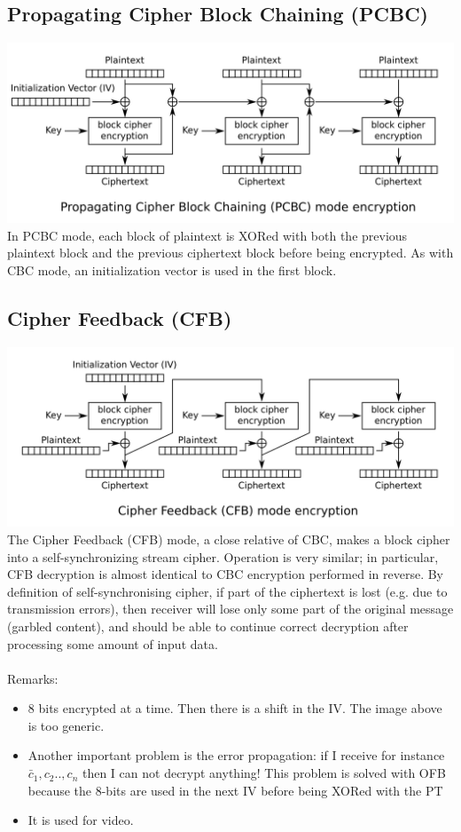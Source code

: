 \documentclass[10pt,a4paper]{article}
\begin{document}
\subsection{Propagating Cipher Block Chaining (PCBC)}
\includegraphics[scale=0.2]{img/PCBC.png}
\newline 
In PCBC mode, each block of plaintext is XORed with both the previous plaintext block and the previous ciphertext block before being encrypted. As with CBC mode, an initialization vector is used in the first block.
\subsection{Cipher Feedback (CFB)}
\includegraphics[scale=0.2]{img/CFB.png}
\newline 
The Cipher Feedback (CFB) mode, a close relative of CBC, makes a block cipher into a self-synchronizing stream cipher. Operation is very similar; in particular, CFB decryption is almost identical to CBC encryption performed in reverse.
By definition of self-synchronising cipher, if part of the ciphertext is lost (e.g. due to transmission errors), then receiver will lose only some part of the original message (garbled content), and should be able to continue correct decryption after processing some amount of input data.\\\\
Remarks:
\begin{itemize} 
\item 8 bits encrypted at a time. Then there is a shift in the IV. The image above is too generic.  
\item Another important problem is the error propagation: if I receive for instance $\bar{c}_1,c_2..,c_n$ then I can not decrypt anything! This problem is solved with OFB because the 8-bits are used in the next IV before being XORed with the PT
\item It is used for video.
\end{itemize}
\end{document}
